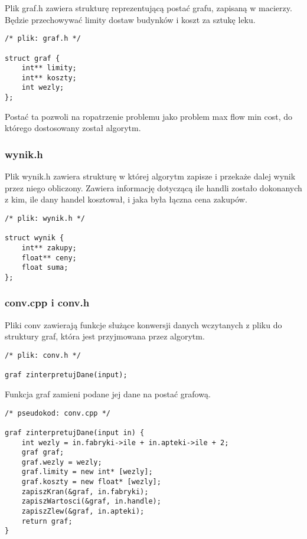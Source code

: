 \documentclass{article}
\begin{document}
Plik graf.h zawiera strukturę reprezentującą postać grafu, zapisaną w macierzy. Będzie przechowywać limity dostaw budynków i koszt za sztukę leku.

\begin{lstlisting}
/* plik: graf.h */

struct graf {
	int** limity;
	int** koszty;
	int wezly;
};
\end{lstlisting}

Postać ta pozwoli na ropatrzenie problemu jako problem max flow min cost, do którego dostosowany został algorytm.

\subsubsection{wynik.h}

Plik wynik.h zawiera strukturę w której algorytm zapisze i przekaże dalej wynik przez niego obliczony. Zawiera informację dotyczącą ile handli zostało dokonanych z kim, ile dany handel kosztował, i jaka była łączna cena zakupów.

\begin{lstlisting}
/* plik: wynik.h */

struct wynik {
	int** zakupy;
	float** ceny;
	float suma;
};
\end{lstlisting}

\subsubsection{conv.cpp i conv.h}

Pliki conv zawierają funkcje służące konwersji danych wczytanych z pliku do struktury graf, która jest przyjmowana przez algorytm.

\begin{lstlisting}
/* plik: conv.h */

graf zinterpretujDane(input);
\end{lstlisting}

Funkcja graf zamieni podane jej dane na postać grafową.

\begin{lstlisting}
/* pseudokod: conv.cpp */

graf zinterpretujDane(input in) {
	int wezly = in.fabryki->ile + in.apteki->ile + 2;
	graf graf;
	graf.wezly = wezly;
	graf.limity = new int* [wezly];
	graf.koszty = new float* [wezly];
	zapiszKran(&graf, in.fabryki);
	zapiszWartosci(&graf, in.handle);
	zapiszZlew(&graf, in.apteki);
	return graf;
}
\end{lstlisting}
\end{document}
